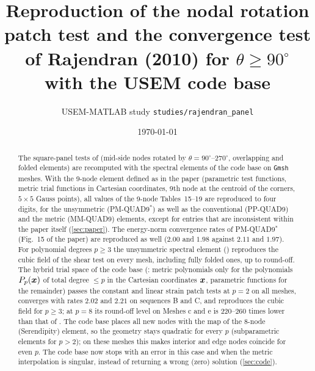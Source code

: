 \documentclass[10pt,a4paper]{article}
\title{Reproduction of the nodal rotation patch test and the convergence test of
       Rajendran (2010) for $\theta\ge90^\circ$ with the USEM code base}
\author{USEM-MATLAB study \texttt{studies/rajendran\_panel}}
\date{\today}
\begin{document}
\maketitle

\begin{abstract}
\noindent
The square-panel tests of \citet[Secs.~5.5--5.7]{Rajendran2010technique} (mid-side nodes
rotated by $\theta=90^\circ$--$270^\circ$, overlapping and folded elements) are recomputed
with the spectral elements of the code base on \texttt{Gmsh} meshes. With the 9-node element defined
as in the paper (parametric test functions, metric trial functions in Cartesian coordinates,
9th node at the centroid of the corners, $5\times5$ Gauss points), all values of the 9-node
Tables~15--19 are reproduced to four digits, for the unsymmetric (PM-QUAD9$^\ast$) as well as
the conventional (PP-QUAD9) and the metric (MM-QUAD9) elements, except for entries that are
inconsistent within the paper itself (\cref{sec:paper}). The energy-norm convergence rates of
PM-QUAD9$^\ast$ (Fig.~15 of the paper) are reproduced as well ($2.00$ and $1.98$ against
$2.11$ and $1.97$). For polynomial degrees $p\ge3$ the unsymmetric spectral element (\PM)
reproduces the cubic field of the shear test on every mesh, including fully folded ones, up to
round-off. The hybrid trial space of the code base (\PH: metric polynomials only for the
polynomials $P_p(\bm{x})$ of total degree $\le p$ in the Cartesian coordinates $\bm{x}$, parametric
functions for the remainder) passes the constant and linear strain patch tests at $p=2$ on all meshes, converges
with rates $2.02$ and $2.21$ on sequences B and C, and reproduces the cubic field for $p\ge3$; at $p=8$
its round-off level on Meshes c and e is $220$--$260$ times lower than that of \PM. The code base
places all new nodes with the map of the 8-node (Serendipity) element, so the geometry stays
quadratic for every $p$ (subparametric elements for $p>2$); on these meshes this makes interior
and edge nodes coincide for even $p$. The code base now stops with an error in this case and when
the metric interpolation is singular, instead of returning a wrong (zero) solution
(\cref{sec:code}).
\end{abstract}
\end{document}
